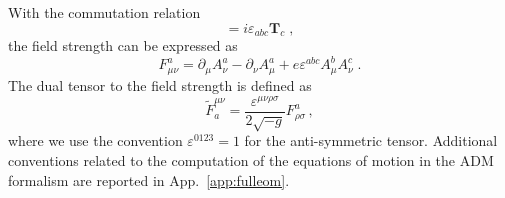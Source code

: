 With the commutation relation
\begin{equation}
	 [\mathbf{T}_a, \mathbf{T}_b] = i \varepsilon_{abc}  \mathbf{T}_c \; ,
\end{equation}
 the field strength can be expressed as
\begin{equation}
	\label{eq:field_strength}
	F^a_{\mu\nu} = \partial_\mu A^a_{\nu} - \partial_\nu A^a_{\mu} + e \varepsilon^{abc} A^b_{\mu}A^c_{\nu} \; .
\end{equation}
The dual tensor to the field strength is defined as
\begin{equation}
\tilde{F}_a^{\mu \nu} = \frac{\varepsilon^{\mu \nu \rho \sigma}}{2 \sqrt{-g}} F^a_{\rho \sigma} \,,
\end{equation}
where we use the convention $\varepsilon^{0123} = 1$ for the anti-symmetric tensor. Additional conventions related to the computation of the equations of motion in the ADM formalism are reported in App.~\ref{app:fulleom}.

